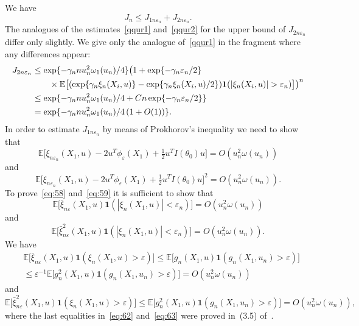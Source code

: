 \documentclass[11pt,a4paper]{article}
\begin{document}
We have
\begin{equation}
J_n\le J_{1n\varepsilon_n}+J_{2n\varepsilon_n}.
\label{eq:56}
\end{equation}
The analogues of the estimates~\ref{qqur1} and~\ref{qqur2} for the upper bound of $J_{2n\varepsilon_n}$ differ only slightly. We give only the analogue of~\ref{qqur1} in the fragment where any differences appear:
\begin{align}
J_{2n\varepsilon_n}
&\le\exp\{-\gamma_n nu_n^2\omega_1(u_n)/4\}\bigl(1+\exp\{-\gamma_n\varepsilon_n/2\}\notag\\
&\qquad\times\mathbb{E}\bigl[(\exp\{\gamma_n\xi_n(X_i,u)\}-\exp\{\gamma_n\xi_n(X_i,u)/2\})\mathbf{1}(|\xi_n(X_i,u)|>\varepsilon_n)\bigr]\bigr)^n\notag\\
&\le\exp\{-\gamma_n nu_n^2\omega_1(u_n)/4+Cn\exp\{-\gamma_n\varepsilon_n/2\}\}\notag\\
&=\exp\{-\gamma_n nu_n^2\omega_1(u_n)/4\,(1+O(1))\}.
\label{eq:57}
\end{align}
In order to estimate $J_{1n\varepsilon_n}$ by means of Prokhorov's inequality we need to show that
\begin{equation}
\mathbb{E}\bigl[\xi_{n\varepsilon_n}(X_1,u)-2u^T\phi_\varepsilon(X_1)+\tfrac12 u^T I(\theta_0)u\bigr]=O(u_n^2\omega(u_n))
\label{eq:58}
\end{equation}
and
\begin{equation}
\mathbb{E}\bigl[\xi_{n\varepsilon_n}(X_1,u)-2u^T\phi_\varepsilon(X_1)+\tfrac12 u^T I(\theta_0)u\bigr]^2=O(u_n^2\omega(u_n)).
\label{eq:59}
\end{equation}
To prove~\eqref{eq:58} and~\eqref{eq:59} it is sufficient to show that
\begin{equation}
\mathbb{E}\bigl[\bar\xi_{n\varepsilon}(X_1,u)\mathbf{1}(|\xi_n(X_1,u)|<\varepsilon_n)\bigr]=O(u_n^2\omega(u_n))
\label{eq:60}
\end{equation}
and
\begin{equation}
\mathbb{E}\bigl[\bar\xi_{n\varepsilon}^2(X_1,u)\mathbf{1}(|\xi_n(X_1,u)|<\varepsilon_n)\bigr]=O(u_n^2\omega(u_n)).
\label{eq:61}
\end{equation}
We have
\begin{equation}
\begin{split} &
\mathbb{E}\bigl[\bar\xi_{n\varepsilon}(X_1,u)\mathbf{1}(\xi_n(X_1,u)>\varepsilon)\bigr]\le\mathbb{E}\bigl[g_n(X_1,u)\mathbf{1}(g_n(X_1,u_n)>\varepsilon)\bigr] \\ &
\le\varepsilon^{-1}\mathbb{E}\bigl[g_n^2(X_1,u)\mathbf{1}(g_n(X_1,u_n)>\varepsilon)\bigr]=O(u_n^2\omega(u_n))
\label{eq:62}
\end{split}
\end{equation}
and
\begin{equation}
\mathbb{E}\bigl[\bar\xi_{n\varepsilon}^2(X_1,u)\mathbf{1}(\xi_n(X_1,u)>\varepsilon)\bigr]
\le\mathbb{E}\bigl[g_n^2(X_1,u)\mathbf{1}(g_n(X_1,u_n)>\varepsilon)\bigr]=O(u_n^2\omega(u_n)),
\label{eq:63}
\end{equation}
where the last equalities in~\eqref{eq:62} and~\eqref{eq:63} were proved in~(3.5) of~\cite{3}.
\end{document}

